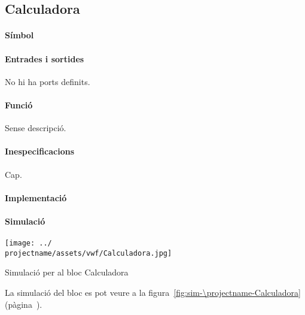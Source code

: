 \subsection{\label{sub:\projectname-Calculadora} \textsf{Calculadora}}

\paragraph{Símbol}

\begin{center}  \end{center}

\paragraph{Entrades i sortides}

No hi ha ports definits.

\paragraph{Funció}

Sense descripció.

\paragraph{Inespecificacions}

Cap.

\paragraph{Implementació}





\paragraph{Simulació}

\begin{contendfig}
  \begin{center}
    \texttt{[image: ../\\projectname/assets/vwf/Calculadora.jpg]}
  \end{center}
  \caption{\label{fig:sim-\projectname-Calculadora} Simulació per al bloc \textsf{Calculadora}}
\end{contendfig}

La simulació del bloc es pot veure a la figura~\ref{fig:sim-\projectname-Calculadora} (pàgina~\pageref{fig:sim-\projectname-Calculadora}).


\vspace{1cm}
